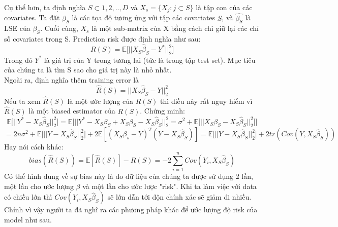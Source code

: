 \documentclass[10pt]{article}
\begin{document}
Cụ thể hơn, ta định nghĩa $S\subset {1,2,..,D}$ và $X_s=\{X_j: j \subset S\}$ là tập con của các covariates. Ta đặt $\beta_S$ là các tọa độ tương ứng với tập các covariates $S$, và $\hat{\beta_S} $ là LSE của $\beta_S$.  Cuối cùng, $X_s$ là một sub-matrix của X bằng cách chỉ giữ lại các chỉ số covariates trong S. Prediction risk được định nghĩa như sau:
\[R(S) = \mathbb{E}\Big[ ||X_S\hat{\beta}_S - Y^{*}||^2_2 \Big ] \]
Trong đó $Y^{*}$ là giá trị của Y trong tương lai (tức là trong tập test set). Mục tiêu của chúng ta là tìm S sao cho giá trị này là nhỏ nhất.\\
Ngoài ra, định nghĩa thêm training error là
\[\hat{R}(S) = ||X_S\hat{\beta}_S - Y ||^2_2 \]
Nếu ta xem $\hat{R}(S)$ là một ước lượng của $R(S)$ thì điều này rất nguy hiểm vì  $\hat{R}(S)$ là một biased estimator của $R(S)$. Chứng minh:
\[ \mathbb{E}\Big [ ||Y^{*} - X_{S}\hat{\beta}_S||_2^2 \Big ] =  \mathbb{E}\Big [ ||Y^{*} -X_{S}\beta_S + X_{S}\beta_S - X_{S}\hat{\beta}_S||_2^2 = \sigma^2 + \mathbb{E}\Big [ ||X_S\beta_S - X_S\hat{\beta}_S||_2^2 \Big ] \Big ] \]
\[ = 2n\sigma^2 + \mathbb{E}\Big [ ||Y - X_S\hat{\beta}_S||_2^2 \Big ] +  2\mathbb{E}[(X_S\beta_s-Y)^{T}(Y - X_S\hat{\beta}_S)] = \mathbb{E}\Big [ ||Y - X_S\hat{\beta}_S ||_2^2 \Big ] + 2tr(Cov(Y,X_S\hat{\beta}_S )) \]
Hay nói cách khác:
\[bias(\hat{R}(S)) = \mathbb{E}[\hat{R}(S)] - R(S) = -2\sum_{i=1}^{n}Cov(Y_i, X_S\hat{\beta}_S) \]
Có thể hình dung về sự bias này là do dữ liệu của chúng ta được sử dụng 2 lần, một lần cho ước lượng $\beta$ và một lần cho ước lược "risk". Khi ta làm việc với data có chiều lớn thì $Cov(Y_i, X_S\hat{\beta}_S)$ sẽ lớn dẫn tới độn chính xác sẽ giảm đi nhiều. Chính vì vậy người ta đã nghĩ ra các phương pháp khác để ước lượng độ risk của model như sau.
\end{document}

